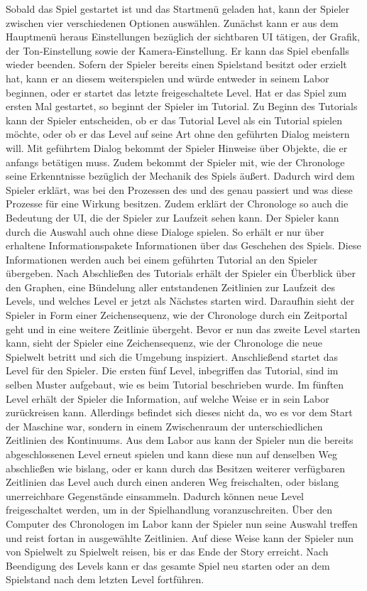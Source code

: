 Sobald das Spiel gestartet ist und das Startmenü geladen hat, kann der Spieler zwischen vier verschiedenen Optionen auswählen. Zunächst kann er aus dem Hauptmenü heraus Einstellungen bezüglich der sichtbaren \ac{UI} tätigen, der Grafik, der Ton-Einstellung sowie der Kamera-Einstellung. Er kann das Spiel ebenfalls wieder beenden. Sofern der Spieler bereits einen Spielstand besitzt oder erzielt hat, kann er an diesem weiterspielen und würde entweder in seinem Labor beginnen, oder er startet das letzte freigeschaltete Level. Hat er das Spiel zum ersten Mal gestartet, so beginnt der Spieler im Tutorial. Zu Beginn des Tutorials kann der Spieler entscheiden, ob er das Tutorial Level als ein Tutorial spielen möchte, oder ob er das Level auf seine Art ohne den geführten Dialog meistern will. Mit geführtem Dialog bekommt der Spieler Hinweise über Objekte, die er anfangs betätigen muss. Zudem bekommt der Spieler mit, wie der Chronologe seine Erkenntnisse bezüglich der Mechanik des Spiels äußert. Dadurch wird dem Spieler erklärt, was bei den Prozessen des  und des  genau passiert und was diese Prozesse für eine Wirkung besitzen. Zudem erklärt der Chronologe so auch die Bedeutung der \ac{UI}, die der Spieler zur Laufzeit sehen kann. Der Spieler kann durch die Auswahl auch ohne diese Dialoge spielen. So erhält er nur über erhaltene Informationspakete Informationen über das Geschehen des Spiels. Diese Informationen werden auch bei einem geführten Tutorial an den Spieler übergeben.
Nach Abschließen des Tutorials erhält der Spieler ein Überblick über den Graphen, eine Bündelung aller entstandenen Zeitlinien zur Laufzeit des Levels, und welches Level er jetzt als Nächstes starten wird. Daraufhin sieht der Spieler in Form einer Zeichensequenz, wie der Chronologe durch ein Zeitportal geht und in eine weitere Zeitlinie übergeht. Bevor er nun das zweite Level starten kann, sieht der Spieler eine Zeichensequenz, wie der Chronologe die neue Spielwelt betritt und sich die Umgebung inspiziert. Anschließend startet das Level für den Spieler. Die ersten fünf Level, inbegriffen das Tutorial, sind im selben Muster aufgebaut, wie es beim Tutorial beschrieben wurde. Im fünften Level erhält der Spieler die Information, auf welche Weise er in sein Labor zurückreisen kann. Allerdings befindet sich dieses nicht da, wo es vor dem Start der Maschine war, sondern in einem Zwischenraum der unterschiedlichen Zeitlinien des Kontinuums. Aus dem Labor aus kann der Spieler nun die bereits abgeschlossenen Level erneut spielen und kann diese nun auf denselben Weg abschließen wie bislang, oder er kann durch das Besitzen weiterer verfügbaren Zeitlinien das Level auch durch einen anderen Weg freischalten, oder bislang unerreichbare Gegenstände einsammeln. Dadurch können neue Level freigeschaltet werden, um in der Spielhandlung voranzuschreiten. Über den Computer des Chronologen im Labor kann der Spieler nun seine Auswahl treffen und reist fortan in ausgewählte Zeitlinien. Auf diese Weise kann der Spieler nun von Spielwelt zu Spielwelt reisen, bis er das Ende der Story erreicht. Nach Beendigung des Levels kann er das gesamte Spiel neu starten oder an dem Spielstand nach dem letzten Level fortführen.

